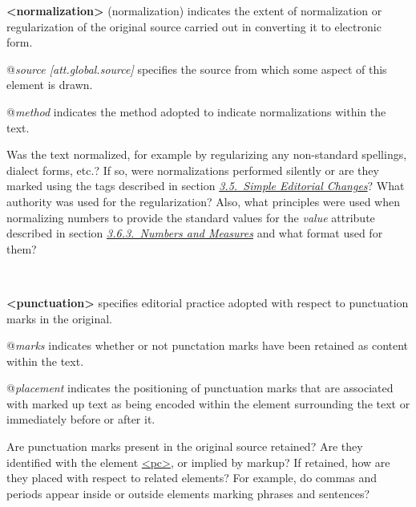 \begin{description}
\begin{sansreflist}
\item [\textbf{<normalization>}] (normalization) indicates the extent of normalization or regularization of the original source carried out in converting it to electronic form.\hfil\\[-10pt]\begin{sansreflist}
    \item[@{\itshape source [att.global.source]}]
  specifies the source from which some aspect of this element is drawn.
    \item[@{\itshape method}]
  indicates the method adopted to indicate normalizations within the text.
\end{sansreflist}  
\end{sansreflist}
 \par
Was the text normalized, for example by regularizing any non-standard spellings, dialect forms, etc.? If so, were normalizations performed silently or are they marked using the tags described in section \textit{\hyperref[COED]{3.5.\ Simple Editorial Changes}}? What authority was used for the regularization? Also, what principles were used when normalizing numbers to provide the standard values for the {\itshape value} attribute described in section \textit{\hyperref[CONANU]{3.6.3.\ Numbers and Measures}} and what format used for them?
\item[{\hyperlink{TEI.punctuation}{}}]\hspace{1em}\hfill\linebreak
\mbox{}\\[-10pt] 
\begin{sansreflist}
  
\item [\textbf{<punctuation>}] specifies editorial practice adopted with respect to punctuation marks in the original.\hfil\\[-10pt]\begin{sansreflist}
    \item[@{\itshape marks}]
  indicates whether or not punctation marks have been retained as content within the text.
    \item[@{\itshape placement}]
  indicates the positioning of punctuation marks that are associated with marked up text as being encoded within the element surrounding the text or immediately before or after it.
\end{sansreflist}  
\end{sansreflist}
 \par
Are punctuation marks present in the original source retained? Are they identified with the element \hyperref[TEI.pc]{<pc>}, or implied by markup? If retained, how are they placed with respect to related elements? For example, do commas and periods appear inside or outside elements marking phrases and sentences?
\item[{\hyperlink{TEI.quotation}{}}]\hspace{1em}\hfill\linebreak
\mbox{}\\[-10pt] 
\begin{sansreflist}
  

\end{sansreflist}
\end{description}
